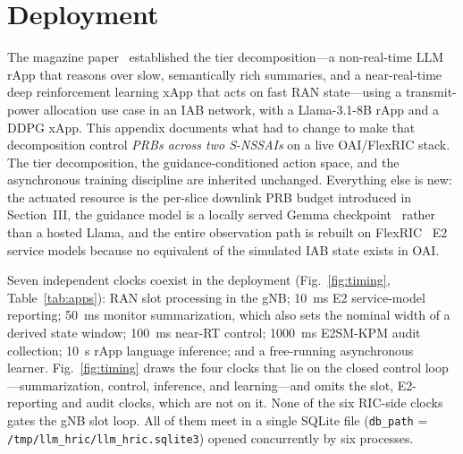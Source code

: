 \section{\systemname{} Deployment}
The magazine paper~\cite{bao2026llmhric} established the \systemname{} tier decomposition---a non-real-time LLM rApp that reasons over slow, semantically rich summaries, and a near-real-time deep reinforcement learning xApp that acts on fast RAN state---using a transmit-power allocation use case in an IAB network, with a Llama-3.1-8B rApp and a DDPG xApp. This appendix documents what had to change to make that decomposition control \emph{PRBs across two S-NSSAIs} on a live OAI/FlexRIC stack. The tier decomposition, the guidance-conditioned action space, and the asynchronous training discipline are inherited unchanged. Everything else is new: the actuated resource is the per-slice downlink PRB budget introduced in Section~III, the guidance model is a locally served Gemma checkpoint~\cite{gemma2024} rather than a hosted Llama, and the entire observation path is rebuilt on FlexRIC~\cite{flexric2026} E2 service models because no equivalent of the simulated IAB state exists in OAI.

Seven independent clocks coexist in the deployment (Fig.~\ref{fig:timing}, Table~\ref{tab:apps}): RAN slot processing in the gNB; 10~ms E2 service-model reporting; 50~ms monitor summarization, which also sets the nominal width of a derived state window; 100~ms near-RT control; 1000~ms E2SM-KPM audit collection; 10~s rApp language inference; and a free-running asynchronous learner. Fig.~\ref{fig:timing} draws the four clocks that lie on the closed control loop---summarization, control, inference, and learning---and omits the slot, E2-reporting and audit clocks, which are not on it. None of the six RIC-side clocks gates the gNB slot loop. All of them meet in a single SQLite file (\texttt{db\_path} = \texttt{/tmp/llm\_hric/llm\_hric.sqlite3}) opened concurrently by six processes.

